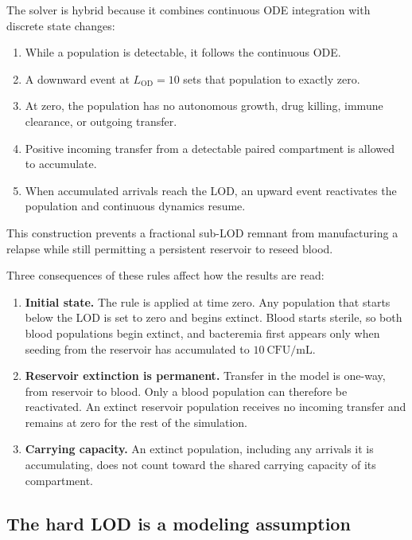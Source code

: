 \documentclass[11pt]{article}
\newcommand{\LOD}{L_{\mathrm{OD}}}
\begin{document}
The solver is hybrid because it combines continuous ODE integration with
discrete state changes:
\begin{enumerate}
\item While a population is detectable, it follows the continuous ODE.
\item A downward event at $\LOD=10$ sets that population to exactly zero.
\item At zero, the population has no autonomous growth, drug killing, immune
clearance, or outgoing transfer.
\item Positive incoming transfer from a detectable paired compartment is
allowed to accumulate.
\item When accumulated arrivals reach the LOD, an upward event reactivates
the population and continuous dynamics resume.
\end{enumerate}
This construction prevents a fractional sub-LOD remnant from manufacturing a
relapse while still permitting a persistent reservoir to reseed blood.

Three consequences of these rules affect how the results are read:
\begin{enumerate}
\item \textbf{Initial state.} The rule is applied at time zero. Any population
that starts below the LOD is set to zero and begins extinct. Blood starts
sterile, so both blood populations begin extinct, and bacteremia first appears
only when seeding from the reservoir has accumulated to $10~\mathrm{CFU/mL}$.
\item \textbf{Reservoir extinction is permanent.} Transfer in the model is
one-way, from reservoir to blood. Only a blood population can therefore be
reactivated. An extinct reservoir population receives no incoming transfer
and remains at zero for the rest of the simulation.
\item \textbf{Carrying capacity.} An extinct population, including any
arrivals it is accumulating, does not count toward the shared carrying
capacity of its compartment.
\end{enumerate}

\subsection{The hard LOD is a modeling assumption}
\end{document}
